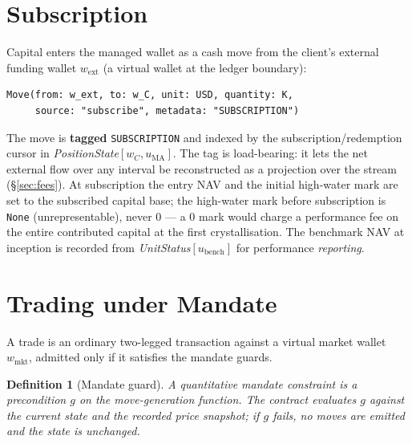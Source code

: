 \documentclass[11pt,a4paper]{article}
\newtheorem{definition}{Definition}[section]
\begin{document}
\section{Subscription}
\label{sec:subscription}

Capital enters the managed wallet as a cash move from the client's external funding wallet
$w_{\text{ext}}$ (a virtual wallet at the ledger boundary):
\begin{lstlisting}
Move(from: w_ext, to: w_C, unit: USD, quantity: K,
     source: "subscribe", metadata: "SUBSCRIPTION")
\end{lstlisting}
The move is \textbf{tagged} \texttt{SUBSCRIPTION} and indexed by the subscription/redemption
cursor in \textit{PositionState}$[w_C,u_{\mathrm{MA}}]$. The tag is load-bearing: it lets the net
external flow over any interval be reconstructed as a projection over the stream
(\S\ref{sec:fees}). At subscription the entry NAV and the initial high-water mark are set to the
subscribed capital base; the high-water mark before subscription is \texttt{None}
(unrepresentable), never $0$ --- a $0$ mark would charge a performance fee on the entire
contributed capital at the first crystallisation. The benchmark NAV at inception is recorded from
\textit{UnitStatus}$[u_{\mathrm{bench}}]$ for performance \emph{reporting}.

\section{Trading under Mandate}
\label{sec:trading}

A trade is an ordinary two-legged transaction against a virtual market wallet $w_{\text{mkt}}$,
admitted only if it satisfies the mandate guards.

\begin{definition}[Mandate guard]
A quantitative mandate constraint is a precondition $g$ on the move-generation function. The
contract evaluates $g$ against the current state and the recorded price snapshot; if $g$ fails,
\emph{no} moves are emitted and the state is unchanged.
\end{definition}
\end{document}
